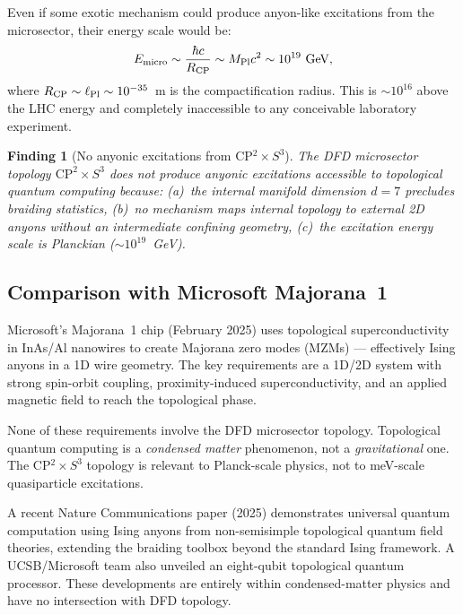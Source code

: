 \documentclass[11pt]{article}
\newtheorem{finding}[theorem]{Finding}
\theoremstyle{definition}
\theoremstyle{remark}
\begin{document}
Even if some exotic mechanism could produce anyon-like excitations from the
microsector, their energy scale would be:
\begin{equation}
  E_{\rm micro} \sim \frac{\hbar c}{R_{\rm CP}} \sim M_{\rm Pl} c^2
  \sim 10^{19}~\text{GeV},
\end{equation}
where $R_{\rm CP} \sim \ell_{\rm Pl} \sim 10^{-35}$~m is the compactification
radius.  This is $\sim 10^{16}$ above the LHC energy and completely inaccessible
to any conceivable laboratory experiment.

\begin{finding}[No anyonic excitations from CP$^2 \times S^3$]
  \label{find:no-anyons}
  The DFD microsector topology $\mathrm{CP}^2 \times S^3$ does not produce
  anyonic excitations accessible to topological quantum computing because:
  (a)~the internal manifold dimension $d=7$ precludes braiding statistics,
  (b)~no mechanism maps internal topology to external 2D anyons without
  an intermediate confining geometry,
  (c)~the excitation energy scale is Planckian ($\sim 10^{19}$~GeV).
\end{finding}

\subsection{Comparison with Microsoft Majorana~1}

Microsoft's Majorana~1 chip (February 2025) uses topological superconductivity
in InAs/Al nanowires to create Majorana zero modes (MZMs) --- effectively
Ising anyons in a 1D wire geometry.  The key requirements are a 1D/2D system
with strong spin-orbit coupling, proximity-induced superconductivity, and an
applied magnetic field to reach the topological phase.

None of these requirements involve the DFD microsector topology.  Topological
quantum computing is a \emph{condensed matter} phenomenon, not a
\emph{gravitational} one.  The CP$^2 \times S^3$ topology is relevant to
Planck-scale physics, not to meV-scale quasiparticle excitations.

A recent Nature Communications paper (2025) demonstrates universal quantum
computation using Ising anyons from non-semisimple topological quantum field
theories, extending the braiding toolbox beyond the standard Ising framework.
A UCSB/Microsoft team also unveiled an eight-qubit topological quantum
processor.  These developments are entirely within condensed-matter physics
and have no intersection with DFD topology.
\end{document}
